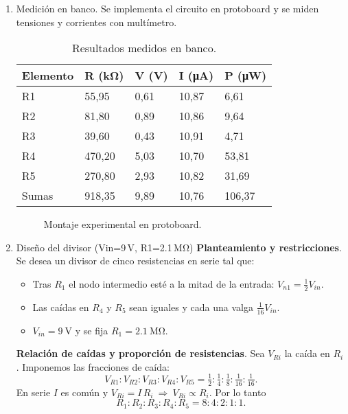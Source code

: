 \documentclass[conference]{IEEEtran}
\begin{document}
\begin{enumerate}[label=\alph*)]
  \item Medición en banco. Se implementa el circuito en protoboard y se miden tensiones y corrientes con multímetro.
  \begin{table}[H]
    \centering
    \begin{tabular}{@{}lllll@{}}
      \toprule
      Elemento & R (k\si{\ohm}) & V (V) & I (\si{\micro\ampere}) & P (\si{\micro\watt}) \\
      \midrule
      R1 & 55,95 & 0,61 & 10,87 & 6,61 \\
      R2 & 81,80 & 0,89 & 10,86 & 9,64 \\
      R3 & 39,60 & 0,43 & 10,91 & 4,71 \\
      R4 & 470,20 & 5,03 & 10,70 & 53,81 \\
      R5 & 270,80 & 2,93 & 10,82 & 31,69 \\
      Sumas & 918,35 & 9,89 & 10,76 & 106,37 \\
      \bottomrule
    \end{tabular}
    \caption{Resultados medidos en banco.}
    \label{tab:med}
  \end{table}
  \begin{figure}[H]
    \centering
    \caption{Montaje experimental en protoboard.}
    \label{fig:montaje}
  \end{figure}

\item Diseño del divisor (Vin=9\,V, R1=2.1\,M\si{\ohm})
\textbf{Planteamiento y restricciones}. Se desea un divisor de cinco resistencias en serie tal que:
\begin{itemize}
  \item Tras $R_1$ el nodo intermedio esté a la mitad de la entrada: $V_{n1}=\tfrac{1}{2}V_{in}$.
  \item Las caídas en $R_4$ y $R_5$ sean iguales y cada una valga $\tfrac{1}{16}V_{in}$.
  \item $V_{in}=\SI{9}{\volt}$ y se fija $R_1=\SI{2.1}{\mega\ohm}$.
\end{itemize}

\textbf{Relación de caídas y proporción de resistencias}. Sea $V_{Ri}$ la caída en $R_i$. Imponemos las fracciones de caída:
\[
  V_{R1}:V_{R2}:V_{R3}:V_{R4}:V_{R5} = \tfrac{1}{2} : \tfrac{1}{4} : \tfrac{1}{8} : \tfrac{1}{16} : \tfrac{1}{16}.
\]
En serie $I$ es común y $V_{Ri}=I\,R_i\ \Rightarrow\ V_{Ri}\propto R_i$. Por lo tanto
\[
  R_1:R_2:R_3:R_4:R_5 = 8:4:2:1:1.
\]


\end{enumerate}
\end{document}
